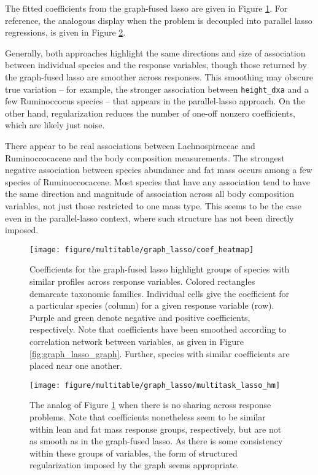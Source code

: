 \documentclass[utf8]{frontiersFPHY} %
\begin{document}
The fitted coefficients from the graph-fused lasso are given in Figure
\ref{fig:graph_lasso_coef_heatmap}. For reference, the analogous display when
the problem is decoupled into parallel lasso regressions, is given in Figure
\ref{fig:graph_lasso_multitask_lasso_hm}. 

Generally, both approaches highlight the same directions and size of association
between individual species and the response variables, though those returned by
the graph-fused lasso are smoother across responses. This smoothing may obscure
true variation -- for example, the stronger association between
\texttt{height\_dxa} and a few Ruminoccocus species -- that appears in the
parallel-lasso approach. On the other hand, regularization reduces the number of
one-off nonzero coefficients, which are likely just noise.

There appear to be real associations between Lachnospiraceae and Ruminoccocaceae
and the body composition measurements. The strongest negative association
between species abundance and fat mass occurs among a few species of
Ruminoccocaceae. Most species that have any association tend to have the same
direction and magnitude of association across all body composition variables,
not just those restricted to one mass type. This seems to be the case even in
the parallel-lasso context, where such structure has not been directly imposed.

\begin{figure}
  \centering
  \texttt{[image: figure/multitable/graph\_lasso/coef\_heatmap]}
  \caption{Coefficients for the graph-fused lasso highlight groups of species
    with similar profiles across response variables. Colored rectangles
    demarcate taxonomic families. Individual cells give the coefficient for a
    particular species (column) for a given response variable (row). Purple and
    green denote negative and positive coefficients, respectively. Note that
    coefficients have been smoothed according to correlation network between
    variables, as given in Figure \ref{fig:graph_lasso_graph}. Further, species
    with similar coefficients are placed near one
    another. \label{fig:graph_lasso_coef_heatmap} }
\end{figure}

\begin{figure}
  \centering
  \texttt{[image: figure/multitable/graph\_lasso/multitask\_lasso\_hm]}
  \caption{The analog of Figure \ref{fig:graph_lasso_coef_heatmap} when there is
    no sharing across response problems. Note that coefficients nonetheless seem
    to be similar within lean and fat mass response groups, respectively, but
    are not as smooth as in the graph-fused lasso. As there is some consistency
    within these groups of variables, the form of structured regularization
    imposed by the graph seems
    appropriate. \label{fig:graph_lasso_multitask_lasso_hm} }
\end{figure}
\end{document}
